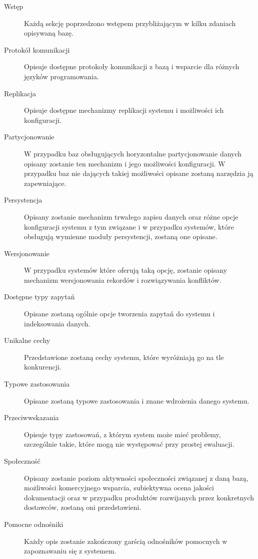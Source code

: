 \begin{description}
 \item[Wstęp] 
 Każdą sekcję poprzedzono wstępem przybliżającym w kilku zdaniach opisywaną bazę. 
 
 \item[Protokół komunikacji]
 Opisuje dostępne protokoły komunikacji z bazą i wsparcie dla różnych języków programowania.

 \item[Replikacja]
 Opisuje dostępne mechanizmy replikacji systemu i możliwości ich konfiguracji.

 \item[Partycjonowanie]
 W przypadku baz obsługujących horyzontalne partycjonowanie danych opisany zostanie ten mechanizm i jego możliwości konfiguracji.
 W przypadku baz nie dających takiej możliwości opisane zostaną narzędzia ją zapewniające.

 \item[Persystencja]
 Opisany zostanie mechanizm trwałego zapisu danych oraz różne opcje konfiguracji systemu z tym związane i w przypadku systemów, które obsługują wymienne moduły persystencji, zostaną one opisane.

 \item[Wersjonowanie]
 W przypadku systemów które oferują taką opcję, zostanie opisany mechanizm wersjonowania rekordów i rozwiązywania konfliktów.

 \item[Dostępne typy zapytań]
 Opisane zostaną ogólnie opcje tworzenia zapytań do systemu i indeksowania danych.

 \item[Unikalne cechy]
 Przedstawione zostaną cechy systemu, które wyróżniają go na tle konkurencji.

 \item[Typowe zastosowania]
 Opisane zostaną typowe zastosowania i znane wdrożenia danego systemu.

 \item[Przeciwwskazania]
 Opisuje typy zastosowań, z którym system może mieć problemy, szczególnie takie, które mogą nie występować przy prostej ewaluacji.

 \item[Społeczność]
 Opisany zostanie poziom aktywności społeczności związanej z daną bazą, możliwości komercyjnego wsparcia, subiektywna ocena jakości dokumentacji oraz w przypadku produktów rozwijanych przez konkretnych dostawców, zostaną oni przedstawieni.

 \item[Pomocne odnośniki]
 Każdy opis zostanie zakończony garścią odnośników pomocnych w zapoznawaniu się z systemem.

\end{description} 